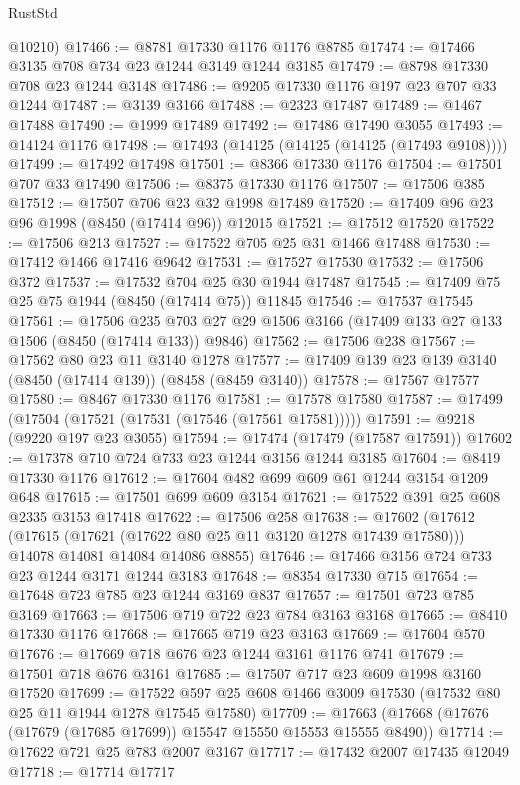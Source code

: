 \begin{lexlean}{RustStd}
\begin{coremodule}
      @10210)
@17466 := @8781 @17330 @1176 @1176 @8785
@17474 := @17466 @3135 @708 @734 @23 @1244 @3149 @1244 @3185
@17479 := @8798 @17330 @708 @23 @1244 @3148
@17486 := @9205 @17330 @1176 @197 @23 @707 @33 @1244
@17487 := @3139 @3166
@17488 := @2323 @17487
@17489 := @1467 @17488
@17490 := @1999 @17489
@17492 := @17486 @17490 @3055
@17493 := @14124 @1176
@17498 := @17493 (@14125 (@14125 (@14125 (@17493 @9108))))
@17499 := @17492 @17498
@17501 := @8366 @17330 @1176
@17504 := @17501 @707 @33 @17490
@17506 := @8375 @17330 @1176
@17507 := @17506 @385
@17512 := @17507 @706 @23 @32 @1998 @17489
@17520 := @17409 @96 @23 @96 @1998 (@8450 (@17414 @96)) @12015
@17521 := @17512 @17520
@17522 := @17506 @213
@17527 := @17522 @705 @25 @31 @1466 @17488
@17530 := @17412 @1466 @17416 @9642
@17531 := @17527 @17530
@17532 := @17506 @372
@17537 := @17532 @704 @25 @30 @1944 @17487
@17545 := @17409 @75 @25 @75 @1944 (@8450 (@17414 @75)) @11845
@17546 := @17537 @17545
@17561 := @17506
    @235
    @703
    @27
    @29
    @1506
    @3166
    (@17409 @133 @27 @133 @1506 (@8450 (@17414 @133)) @9846)
@17562 := @17506 @238
@17567 := @17562 @80 @23 @11 @3140 @1278
@17577 := @17409 @139 @23 @139 @3140 (@8450 (@17414 @139)) (@8458 (@8459 @3140))
@17578 := @17567 @17577
@17580 := @8467 @17330 @1176
@17581 := @17578 @17580
@17587 := @17499 (@17504 (@17521 (@17531 (@17546 (@17561 @17581)))))
@17591 := @9218 (@9220 @197 @23 @3055)
@17594 := @17474 (@17479 (@17587 @17591))
@17602 := @17378 @710 @724 @733 @23 @1244 @3156 @1244 @3185
@17604 := @8419 @17330 @1176
@17612 := @17604 @482 @699 @609 @61 @1244 @3154 @1209 @648
@17615 := @17501 @699 @609 @3154
@17621 := @17522 @391 @25 @608 @2335 @3153 @17418
@17622 := @17506 @258
@17638 := @17602
    (@17612
      (@17615 (@17621 (@17622 @80 @25 @11 @3120 @1278 @17439 @17580)))
      @14078
      @14081
      @14084
      @14086
      @8855)
@17646 := @17466 @3156 @724 @733 @23 @1244 @3171 @1244 @3183
@17648 := @8354 @17330 @715
@17654 := @17648 @723 @785 @23 @1244 @3169 @837
@17657 := @17501 @723 @785 @3169
@17663 := @17506 @719 @722 @23 @784 @3163 @3168
@17665 := @8410 @17330 @1176
@17668 := @17665 @719 @23 @3163
@17669 := @17604 @570
@17676 := @17669 @718 @676 @23 @1244 @3161 @1176 @741
@17679 := @17501 @718 @676 @3161
@17685 := @17507 @717 @23 @609 @1998 @3160 @17520
@17699 := @17522 @597 @25 @608 @1466 @3009 @17530 (@17532 @80 @25 @11 @1944 @1278 @17545 @17580)
@17709 := @17663 (@17668 (@17676 (@17679 (@17685 @17699)) @15547 @15550 @15553 @15555 @8490))
@17714 := @17622 @721 @25 @783 @2007 @3167
@17717 := @17432 @2007 @17435 @12049
@17718 := @17714 @17717

\end{coremodule}
\end{lexlean}

